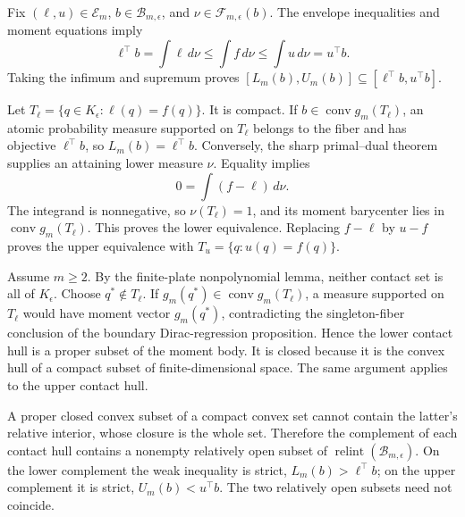 Fix \((\ell,u)\in\mathcal E_m\), \(b\in\mathcal B_{m,\epsilon}\), and \(\nu\in\mathcal F_{m,\epsilon}(b)\).  The envelope inequalities and moment equations imply
\[
 \ell^{\top}b=\int\ell\,d\nu
 \leq\int f\,d\nu
 \leq\int u\,d\nu=u^{\top}b.
\]
Taking the infimum and supremum proves \([L_m(b),U_m(b)]\subseteq[\ell^{\top}b,u^{\top}b]\).

Let \(T_{\ell}=\{q\in K_{\epsilon}:\ell(q)=f(q)\}\).  It is compact.  If \(b\in\operatorname{conv}g_m(T_{\ell})\), an atomic probability measure supported on \(T_{\ell}\) belongs to the fiber and has objective \(\ell^{\top}b\), so \(L_m(b)=\ell^{\top}b\).  Conversely, the sharp primal--dual theorem supplies an attaining lower measure \(\nu\).  Equality implies
\[
 0=\int(f-\ell)\,d\nu.
\]
The integrand is nonnegative, so \(\nu(T_{\ell})=1\), and its moment barycenter lies in \(\operatorname{conv}g_m(T_{\ell})\).  This proves the lower equivalence.  Replacing \(f-\ell\) by \(u-f\) proves the upper equivalence with \(T_u=\{q:u(q)=f(q)\}\).

Assume \(m\geq2\).  By the finite-plate nonpolynomial lemma, neither contact set is all of \(K_{\epsilon}\).  Choose \(q^*\notin T_{\ell}\).  If \(g_m(q^*)\in\operatorname{conv}g_m(T_{\ell})\), a measure supported on \(T_{\ell}\) would have moment vector \(g_m(q^*)\), contradicting the singleton-fiber conclusion of the boundary Dirac-regression proposition.  Hence the lower contact hull is a proper subset of the moment body.  It is closed because it is the convex hull of a compact subset of finite-dimensional space.  The same argument applies to the upper contact hull.

A proper closed convex subset of a compact convex set cannot contain the latter's relative interior, whose closure is the whole set.  Therefore the complement of each contact hull contains a nonempty relatively open subset of \(\operatorname{relint}(\mathcal B_{m,\epsilon})\).  On the lower complement the weak inequality is strict, \(L_m(b)>\ell^{\top}b\); on the upper complement it is strict, \(U_m(b)<u^{\top}b\).  The two relatively open subsets need not coincide.